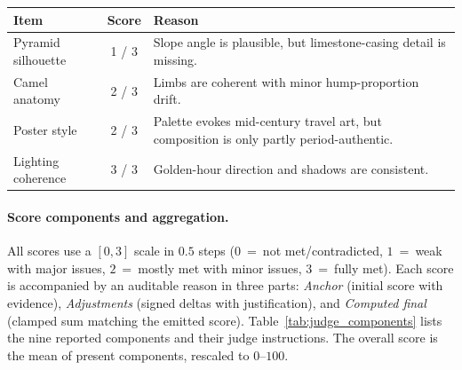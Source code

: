 \begin{tcolorbox}[appscorebox, title={Evaluation Output Example (Parsed, abbreviated)}]
{\footnotesize
\setlength{\tabcolsep}{4pt}
\renewcommand{\arraystretch}{1.15}
\begin{tabularx}{\linewidth}{@{}p{2.4cm}cX@{}}
\toprule
\textbf{Item} & \textbf{Score} & \textbf{Reason} \\
\midrule
Pyramid silhouette & 1 / 3 & Slope angle is plausible, but limestone-casing detail is missing. \\
Camel anatomy & 2 / 3 & Limbs are coherent with minor hump-proportion drift. \\
Poster style & 2 / 3 & Palette evokes mid-century travel art, but composition is only partly period-authentic. \\
Lighting coherence & 3 / 3 & Golden-hour direction and shadows are consistent. \\
\bottomrule
\end{tabularx}
\par}
\end{tcolorbox}
\label{fig:eval_output}
\fi

\bigskip

\paragraph{Score components and aggregation.}
All scores use a $[0,3]$ scale in $0.5$ steps ($0$~=~not met/contradicted, $1$~=~weak with major issues, $2$~=~mostly met with minor issues, $3$~=~fully met).
Each score is accompanied by an auditable reason in three parts: \emph{Anchor} (initial score with evidence), \emph{Adjustments} (signed deltas with justification), and \emph{Computed final} (clamped sum matching the emitted score).
Table~\ref{tab:judge_components} lists the nine reported components and their judge instructions.
The overall score is the mean of present components, rescaled to $0$--$100$.

